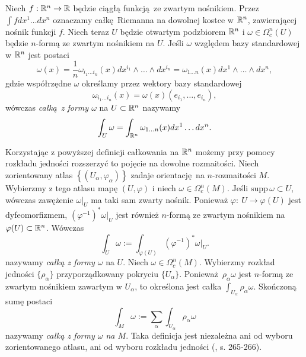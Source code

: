 Niech \(f: \mathbb{R}^n \to \mathbb{R}\) będzie ciągłą funkcją ze zwartym nośnikiem. Przez \(\int f dx^1 \dots dx^n\) oznaczamy całkę Riemanna na dowolnej kostce w \(\mathbb{R}^n\), zawierającej nośnik funkcji \(f\). Niech teraz \(U\) będzie otwartym podzbiorem \(\mathbb{R}^n\) i \(\omega\in\Omega^n_c(U)\) będzie \(n\)-formą ze zwartym nośnikiem na \(U\). Jeśli \(\omega\) względem bazy standardowej w \(\mathbb{R}^n\) jest postaci
\begin{equation*}
    \omega(x)=\frac{1}{n} \omega_{i_1\dots i_n}(x) dx^{i_1}\wedge\dots\wedge dx^{i_n} = \omega_{1\dots n}(x)dx^1\wedge\dots\wedge dx^n,
\end{equation*}
gdzie współrzędne \(\omega\) określamy przez wektory bazy standardowej
\begin{equation*}
    \omega_{i_1\dots i_n}(x) = \omega(x)(e_{i_1}, \dots, e_{i_n}),
\end{equation*}
wówczas \emph{całką z formy \(\omega\)} na \(U\subset\mathbb{R}^n\) nazywamy
\begin{equation*}
    \int_U \omega = \int_{\mathbb{R}^n} \omega_{1\dots n}(x) dx^1\dots dx^n.
\end{equation*}

Korzystając z powyższej definicji całkowania na \(\mathbb{R}^n\) możemy przy pomocy rozkładu jedności rozszerzyć to pojęcie na dowolne rozmaitości. Niech zorientowany atlas \(\left\{(U_{\alpha}, \varphi_{\alpha})\right\}\) zadaje orientację na \(n\)-rozmaitości \(M\). Wybierzmy z tego atlasu mapę \((U, \varphi)\) i niech \(\omega\in\Omega^n_c(M)\). Jeśli \(\mathrm{supp}\,\omega \subset U\), wówczas zawężenie \(\left.\omega\right|_U\) ma taki sam zwarty nośnik. Ponieważ \(\varphi:\:U\to\varphi(U)\) jest dyfeomorfizmem, \((\varphi^{-1})^\ast\left.\omega\right|_U\) jest również \(n\)-formą ze zwartym nośnikiem na \(\varphi(U)\subset\mathbb{R}^n\). Wówczas
\begin{equation*}
    \int_U \omega := \int_{\varphi(U)} (\varphi^{-1})^{\ast}\left.\omega\right|_U.
\end{equation*}
nazywamy \emph{całką z formy \(\omega\)} na \(U\).  
Niech \(\omega\in\Omega^n_c(M)\). Wybierzmy rozkład jedności \(\{\rho_{\alpha}\}\) przyporządkowany pokryciu \(\{U_{\alpha}\}\). Ponieważ \(\rho_{\alpha}\omega\) jest \(n\)-formą ze zwartym nośnikiem zawartym w \(U_{\alpha}\), to określona jest całka \(\int_{U_\alpha} \rho_{\alpha} \omega\). Skończoną sumę postaci
\begin{equation*}
    \int_M \omega := \sum_{\alpha} \int_{U_{\alpha}} \rho_{\alpha}\omega 
\end{equation*}
nazywamy \emph{całką z formy \(\omega\) na \(M\)}. Taka definicja jest niezależna ani od wyboru zorientowanego atlasu, ani od wyboru rozkładu jedności (\cite{tu}, s. 265-266).

